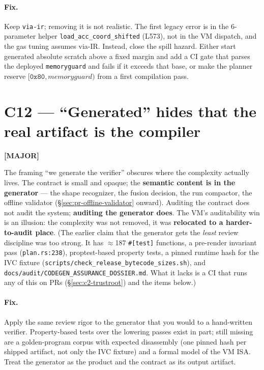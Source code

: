 \paragraph{Fix.}
Keep \texttt{via-ir}; removing it is not realistic. The first legacy
error is in the 6-parameter helper \texttt{load\_\allowbreak{}acc\_\allowbreak{}coord\_\allowbreak{}shifted}
(L573), not in the VM dispatch, and the gas tuning assumes via-IR.
Instead, close the spill hazard. Either
start generated absolute scratch above a fixed margin and add a CI
gate that parses the deployed \texttt{memoryguard} and fails if it
exceeds that base, or make the planner reserve
$[\texttt{0x80},\textit{memoryguard})$ from a first compilation pass.

\section{C12 --- ``Generated'' hides that the real artifact is the compiler}
\label{sec:c12-framing}
\textcolor{mathpurple}{\textbf{[MAJOR]}} 

The framing ``we generate the verifier'' obscures where the
complexity actually lives. The contract is small and opaque; the
\textbf{semantic content is in the generator} --- the shape
recognizer, the fusion decision, the run compactor, the offline
validator (\S\ref{sec:pr-offline-validator} onward). Auditing the
contract does not audit the system; \textbf{auditing the
generator does}. The VM's auditability win is an illusion: the
complexity was not removed, it was \textbf{relocated to a
harder-to-audit place}. (The earlier claim that the generator gets
the \emph{least} review discipline was too strong. It has
$\approx$187 \texttt{\#[test]} functions, a pre-render invariant
pass (\texttt{plan.rs:238}), proptest-based property tests, a
pinned runtime hash for the IVC fixture
(\texttt{scripts/\allowbreak{}check\_\allowbreak{}release\_\allowbreak{}bytecode\_\allowbreak{}sizes.sh}), and
\texttt{docs/\allowbreak{}audit/\allowbreak{}CODEGEN\_\allowbreak{}ASSURANCE\_\allowbreak{}DOSSIER.md}. What it lacks is
a CI that runs any of this on PRs (\S\ref{sec:c2-trustroot}) and
the items below.)

\paragraph{Fix.}
Apply the same review rigor to the generator that you would to a
hand-written verifier. Property-based tests over the lowering
passes exist in part; still missing are a golden-program corpus
with expected disassembly (one pinned hash per shipped artifact,
not only the IVC fixture) and a formal model of the VM ISA. Treat
the generator as the product and the contract as its output
artifact.

